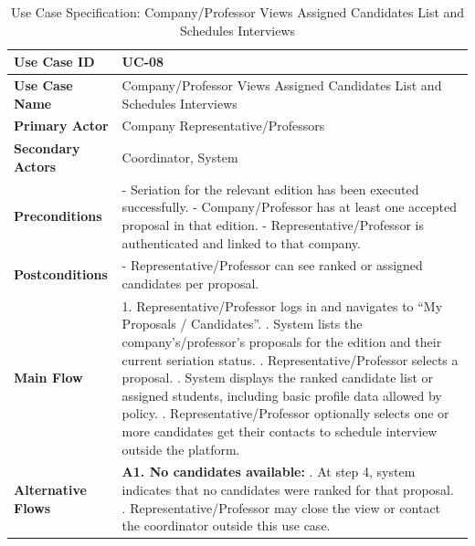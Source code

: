\newpage
\renewcommand{\arraystretch}{1.5} 
\begin{xltabular}{\textwidth}{|l|X|}
    \caption{Use Case Specification: Company/Professor Views Assigned Candidates List and Schedules Interviews} \label{tab:UC-08} \\
    
    \hline
    \textbf{Use Case ID} & UC-08 \\ \hline
    \textbf{Use Case Name} & Company/Professor Views Assigned Candidates List and Schedules Interviews \\ \hline
    \textbf{Primary Actor} & Company Representative/Professors \\ \hline
    \textbf{Secondary Actors} & Coordinator, System \\ \hline
    \textbf{Preconditions} &
        - Seriation for the relevant edition has been executed successfully. \newline
        - Company/Professor has at least one accepted proposal in that edition. \newline
        - Representative/Professor is authenticated and linked to that company.
        \\ \hline
    \textbf{Postconditions} &
        - Representative/Professor can see ranked or assigned candidates per proposal.
        \\ \hline
    \textbf{Main Flow} &
        1. Representative/Professor logs in and navigates to “My Proposals / Candidates”. . System lists the company’s/professor's proposals for the edition and their current seriation status. . Representative/Professor selects a proposal. . System displays the ranked candidate list or assigned students, including basic profile data allowed by policy. . Representative/Professor optionally selects one or more candidates get their contacts to schedule interview outside the platform. \\ \hline
    \textbf{Alternative Flows} &
        \textbf{A1. No candidates available:} . At step 4, system indicates that no candidates were ranked for that proposal. . Representative/Professor may close the view or contact the coordinator outside this use case. \\ \hline
\end{xltabular}

